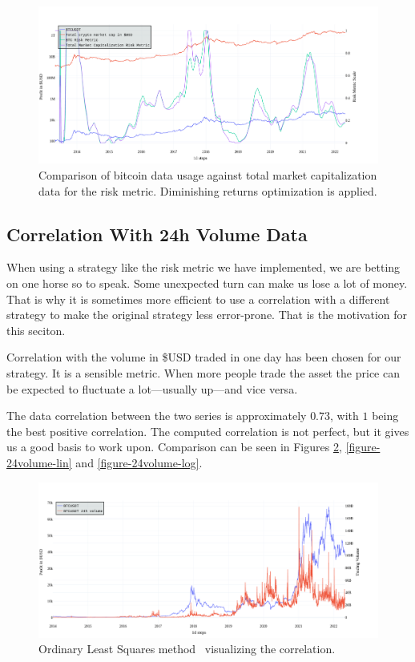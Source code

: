 \begin{figure}[!hbt]
    \centering
    \includegraphics[width=\columnwidth]{figures/totalmarketcap-metric-dimreturns.png}
    \caption{Comparison of bitcoin data usage against total market capitalization data for the risk metric. Diminishing returns optimization is applied.}
    \label{figure-total-marketcap-riskmetric-dim-returns}
\end{figure}

\subsection*{Correlation With 24h Volume Data}
\label{subsection-24hvolume-correlation}
When using a strategy like the risk metric we have implemented, we are betting on one horse so to speak. Some unexpected turn can make us lose a lot of money. That is why it is sometimes more efficient to use a correlation with a different strategy to make the original strategy less error-prone. That is the motivation for this seciton.

Correlation with the volume in \$USD traded in one day has been chosen for our strategy. It is a sensible metric. When more people trade the asset the price can be expected to fluctuate a lot---usually up---and vice versa.

The data correlation between the two series is approximately $0.73$, with $1$ being the best positive correlation. The computed correlation is not perfect, but it gives us a good basis to work upon. Comparison can be seen in Figures \ref{figure-24volume-ols}, \ref{figure-24volume-lin} and \ref{figure-24volume-log}.

\begin{figure}[!hbt]
    \centering
    \includegraphics[width=\columnwidth]{figures/24volume-ols.png}
    \caption{Ordinary Least Squares method~\cite{wikipedia:ols} visualizing the correlation.}
    \label{figure-24volume-ols}
\end{figure}

